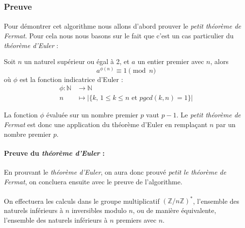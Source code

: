 	
	\subsubsection{Preuve}
		\paragraph{}Pour démontrer cet algorithme nous allons d'abord prouver le \textit{petit théorème de Fermat}. Pour cela nous nous basons sur le fait que c'est un cas particulier du \textit{théorème d'Euler} :
		
		\vspace{-1.5em}\begin{adjustwidth}{1.5cm}{1.5cm} 
		\begin{Th}
			\label{ThEuler}
			Soit $n$ un naturel supérieur ou égal à 2, et $a$ un entier premier avec $n$, alors
			\[a^{\phi(n)}\equiv 1 \pmod n\]
			où $\phi$ est la fonction indicatrice d'Euler :
			\begin{align*}
				\phi \colon \mathbb{N} &\to \mathbb{N}\\
				n &\mapsto | \{k \text{, } 1 \leq k \leq n \text{ et } pgcd(k,n) = 1\} |
			\end{align*}
		\end{Th}
		\end{adjustwidth}\vspace{0.5em}
		
		La fonction $\phi$ évaluée sur un nombre premier $p$ vaut $p - 1$. Le \textit{petit théorème de Fermat} est donc une application du théorème d'Euler en remplaçant $n$ par un nombre premier $p$.
		
		\paragraph{Preuve du \textit{théorème d'Euler} :} 
		\paragraph{}En prouvant le \textit{théorème d'Euler}, on aura donc prouvé \textit{petit le théorème de Fermat}, on concluera ensuite avec le preuve de l'algorithme.
			
		\paragraph{}On effectuera les calculs dans le groupe multiplicatif $(\mathbb{Z}/n\mathbb{Z})^*$, l'ensemble des naturels inférieurs à $n$ inversibles modulo $n$, ou de manière équivalente, l'ensemble des naturels inférieurs à $n$ premiers avec $n$.
		
